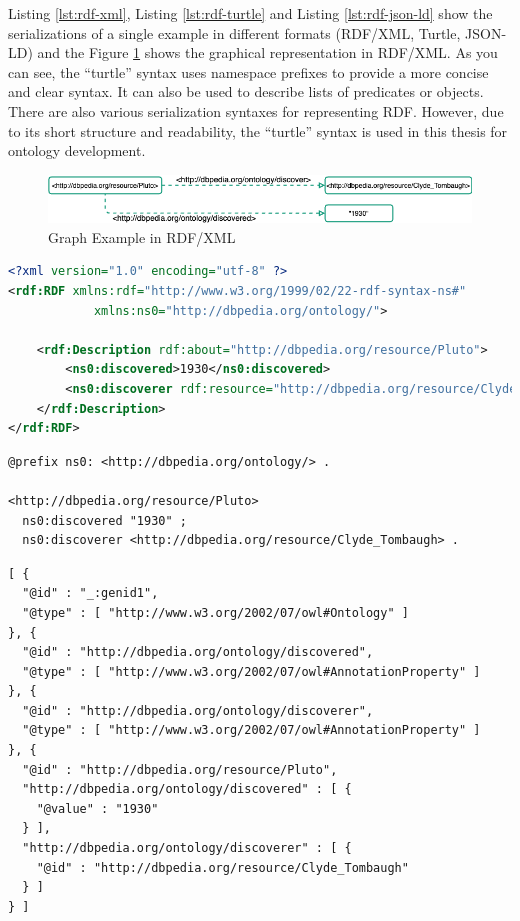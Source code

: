                 Listing \ref{lst:rdf-xml}, Listing \ref{lst:rdf-turtle} and Listing \ref{lst:rdf-json-ld} show the serializations of a single example in different formats (RDF/XML, Turtle, JSON-LD) and the Figure \ref{fig:rdf-xml-example} shows the graphical representation in RDF/XML. As you can see, the “turtle” syntax uses namespace prefixes to provide a more concise and clear syntax. It can also be used to describe lists of predicates or objects. There are also various serialization syntaxes for representing RDF. However, due to its short structure and readability, the “turtle” syntax is used in this thesis for ontology development.\\
            
                \begin{figure}[h]
                    \centering
                    \includegraphics[scale=0.6]{images/Foundation-RDF XML.drawio.png}
                    \caption{\label{fig:rdf-xml-example}  Graph Example in RDF/XML}
                \end{figure}

                \begin{lstlisting}[language=XML, caption=Example of RDF Serialization in RDF/XML, label={lst:rdf-xml}]
<?xml version="1.0" encoding="utf-8" ?>
<rdf:RDF xmlns:rdf="http://www.w3.org/1999/02/22-rdf-syntax-ns#"
            xmlns:ns0="http://dbpedia.org/ontology/">

    <rdf:Description rdf:about="http://dbpedia.org/resource/Pluto">
        <ns0:discovered>1930</ns0:discovered>
        <ns0:discoverer rdf:resource="http://dbpedia.org/resource/Clyde_Tombaugh"/>
    </rdf:Description>
</rdf:RDF>
                \end{lstlisting}

                \begin{lstlisting}[caption=Example of RDF Serialization in Turtle, label={lst:rdf-turtle}]
@prefix ns0: <http://dbpedia.org/ontology/> .

<http://dbpedia.org/resource/Pluto>
  ns0:discovered "1930" ;
  ns0:discoverer <http://dbpedia.org/resource/Clyde_Tombaugh> .
                \end{lstlisting}

                \begin{lstlisting}[caption=Example of RDF Serialization in JSON-LD, label={lst:rdf-json-ld}]
[ {
  "@id" : "_:genid1",
  "@type" : [ "http://www.w3.org/2002/07/owl#Ontology" ]
}, {
  "@id" : "http://dbpedia.org/ontology/discovered",
  "@type" : [ "http://www.w3.org/2002/07/owl#AnnotationProperty" ]
}, {
  "@id" : "http://dbpedia.org/ontology/discoverer",
  "@type" : [ "http://www.w3.org/2002/07/owl#AnnotationProperty" ]
}, {
  "@id" : "http://dbpedia.org/resource/Pluto",
  "http://dbpedia.org/ontology/discovered" : [ {
    "@value" : "1930"
  } ],
  "http://dbpedia.org/ontology/discoverer" : [ {
    "@id" : "http://dbpedia.org/resource/Clyde_Tombaugh"
  } ]
} ]
                \end{lstlisting}

